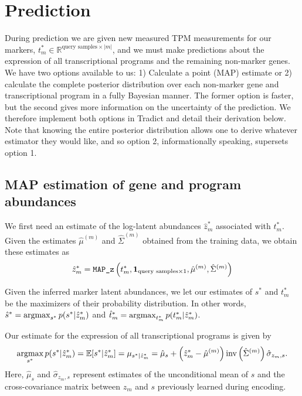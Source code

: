 \documentclass[10pt]{article}
\newcommand{\argmax}{\operatornamewithlimits{argmax}}
\begin{document}
\section{Prediction}

During prediction we are given new measured TPM measurements for our markers, $t^*_m \in \mathbb{R}^{\textrm{query samples} \times |m|} $, and we must make predictions about the expression of all transcriptional programs and the remaining non-marker genes. We have two options available to us: 1) Calculate a point (MAP) estimate or 2) calculate the complete posterior distribution over each non-marker gene and transcriptional program in a fully Bayesian manner. The former option is faster, but the second gives more information on the uncertainty of the prediction. We therefore implement both options in Tradict and detail their derivation below. Note that knowing the entire posterior distribution allows one to derive whatever estimator they would like, and so option 2, informationally speaking, supersets option 1. 

\subsection{MAP estimation of gene and program abundances}
We first need an estimate of the log-latent abundances $\hat{z}_m^*$ associated with $t^*_m $. Given the estimates $\hat{\mu}^{(m)}$ and $\hat{\Sigma}^{(m)} $ obtained from the training data, we obtain these estimates as 
\[
\hat{z}_m^* = \verb|MAP_z| \left(t_m^*, \textbf{1}_{\textrm{query samples} \times 1}, \hat{\mu}^{(m)}, \hat{\Sigma}^{(m)} \right)
\]



Given the inferred marker latent abundances, we let our estimates of $s^*$ and $t_m^*$ be the maximizers of their probability distribution. In other words, $\hat{s}^* = \argmax_{s^*} p(s^* | \hat{z}_m^*)$ and $\hat{t}_m^* = \argmax_{t_m^*} p(t_m^* | \hat{z}_m^*)$. 

Our estimate for the expression of all transcriptional programs is given by
\[
\argmax_{s^*} p(s^* | \hat{z}_m^*) = \mathbb{E}[s^* |\hat{z}_m^* ] = \mu_{s^* |\hat{z}_m^* } = \hat{\mu}_s + \left(\hat{z}_m^*  - \hat{\mu}^{(m)} \right)\textrm{inv}\left( \hat{\Sigma}^{(m)} \right)\hat{\sigma}_{z_{m},s}.
\]
Here, $\hat{\mu}_s $ and $\hat{\sigma}_{z_{m},s}$ represent estimates of the unconditional mean of $s$ and the cross-covariance matrix between $z_m$ and $s$ previously learned during encoding.
\end{document}
